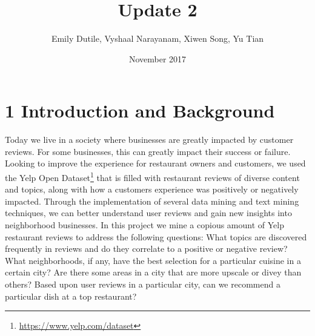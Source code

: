 \documentclass{neu_handout}
\title{Update 2}
\author{Emily Dutile, Vyshaal Narayanam, Xiwen Song, Yu Tian}
\date{November 2017}
\begin{document}
\section*{1 Introduction and Background}
Today we live in a society where businesses are greatly impacted by customer reviews. For some businesses, this can greatly impact their success or failure. Looking to improve the
experience for restaurant owners and customers, we used the Yelp Open Dataset\footnote{\url{https://www.yelp.com/dataset}} that is filled with restaurant reviews of diverse content and topics, along with how a customers experience was positively or negatively impacted. Through the implementation of several data mining and text mining techniques, we can better understand user reviews and gain new insights into neighborhood businesses. In this project we mine a copious amount of Yelp restaurant reviews to address the following questions: What topics are discovered frequently in reviews and do they correlate to a positive or negative review? What neighborhoods, if any, have the best selection for a particular cuisine in a certain city? Are there some areas in a city that are more upscale or divey than others? Based upon user reviews in a particular city, can we recommend a particular dish at a top restaurant?
\end{document}
